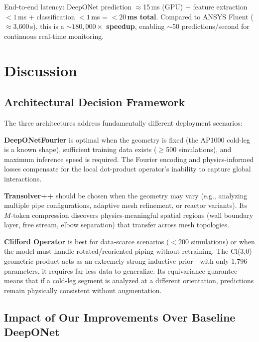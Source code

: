 \documentclass[conference]{IEEEtran}
\begin{document}
End-to-end latency: DeepONet prediction $\approx$15\,ms (GPU) + feature extraction $< 1$\,ms + classification $< 1$\,ms = \textbf{$< 20$\,ms total}. Compared to ANSYS Fluent ($\approx$3,600\,s), this is a \textbf{${\sim}180{,}000\times$ speedup}, enabling $\sim$50 predictions/second for continuous real-time monitoring.

\section{Discussion}
\label{sec:discussion}

\subsection{Architectural Decision Framework}

The three architectures address fundamentally different deployment scenarios:

\textbf{DeepONetFourier} is optimal when the geometry is fixed (the AP1000 cold-leg is a known shape), sufficient training data exists ($\geq$500 simulations), and maximum inference speed is required. The Fourier encoding and physics-informed losses compensate for the local dot-product operator's inability to capture global interactions.

\textbf{Transolver++} should be chosen when the geometry may vary (e.g., analyzing multiple pipe configurations, adaptive mesh refinement, or reactor variants). Its $M$-token compression discovers physics-meaningful spatial regions (wall boundary layer, free stream, elbow separation) that transfer across mesh topologies.

\textbf{Clifford Operator} is best for data-scarce scenarios ($< 200$ simulations) or when the model must handle rotated/reoriented piping without retraining. The Cl(3,0) geometric product acts as an extremely strong inductive prior---with only 1,796 parameters, it requires far less data to generalize. Its equivariance guarantee means that if a cold-leg segment is analyzed at a different orientation, predictions remain physically consistent without augmentation.

\subsection{Impact of Our Improvements Over Baseline DeepONet}
\end{document}
